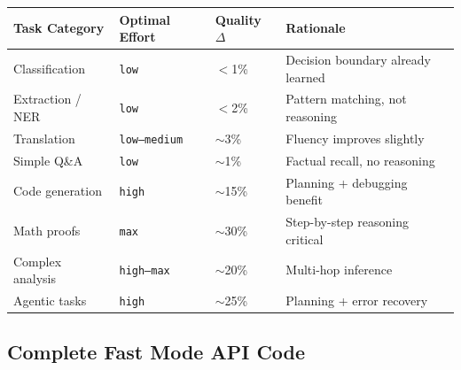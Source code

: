 \documentclass[11pt,a4paper]{article}
\begin{document}
\begin{center}
\begin{tabular}{L{3.5cm}llL{4cm}}
\toprule
\textbf{Task Category} & \textbf{Optimal Effort} & \textbf{Quality $\Delta$} & \textbf{Rationale} \\
\midrule
Classification & \texttt{low} & $<$1\% & Decision boundary already learned \\
Extraction / NER & \texttt{low} & $<$2\% & Pattern matching, not reasoning \\
Translation & \texttt{low--medium} & $\sim$3\% & Fluency improves slightly \\
Simple Q\&A & \texttt{low} & $\sim$1\% & Factual recall, no reasoning \\
Code generation & \texttt{high} & $\sim$15\% & Planning + debugging benefit \\
Math proofs & \texttt{max} & $\sim$30\% & Step-by-step reasoning critical \\
Complex analysis & \texttt{high--max} & $\sim$20\% & Multi-hop inference \\
Agentic tasks & \texttt{high} & $\sim$25\% & Planning + error recovery \\
\bottomrule
\end{tabular}
\end{center}

\subsection{Complete Fast Mode API Code}
\end{document}
